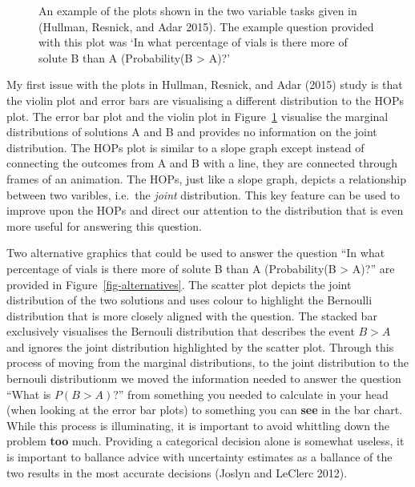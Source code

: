 \documentclass[
  letterpaper,
  DIV=11,
  numbers=noendperiod]{scrartcl}
\begin{document}
\begin{figure}
\begin{minipage}[t]{0.50\linewidth}
{{}

}

\end{minipage}%

\caption{\label{fig-examples}An example of the plots shown in the two
variable tasks given in (Hullman, Resnick, and Adar 2015). The example
question provided with this plot was `In what percentage of vials is
there more of solute B than A (Probability(B \textgreater{} A)?'}

\end{figure}

My first issue with the plots in Hullman, Resnick, and Adar (2015) study
is that the violin plot and error bars are visualising a different
distribution to the HOPs plot. The error bar plot and the violin plot in
Figure~\ref{fig-examples} visualise the marginal distributions of
solutions A and B and provides no information on the joint distribution.
The HOPs plot is similar to a slope graph except instead of connecting
the outcomes from A and B with a line, they are connected through frames
of an animation. The HOPs, just like a slope graph, depicts a
relationship between two varibles, i.e.~the \emph{joint} distribution.
This key feature can be used to improve upon the HOPs and direct our
attention to the distribution that is even more useful for answering
this question.

Two alternative graphics that could be used to answer the question ``In
what percentage of vials is there more of solute B than A (Probability(B
\textgreater{} A)?'' are provided in Figure~\ref{fig-alternatives}. The
scatter plot depicts the joint distribution of the two solutions and
uses colour to highlight the Bernoulli distribution that is more closely
aligned with the question. The stacked bar exclusively visualises the
Bernouli distribution that describes the event \(B>A\) and ignores the
joint distribution highlighted by the scatter plot. Through this process
of moving from the marginal distributions, to the joint distribution to
the bernouli distributionm we moved the information needed to answer the
question ``What is \(P(B>A)\)?'' from something you needed to calculate
in your head (when looking at the error bar plots) to something you can
\textbf{see} in the bar chart. While this process is illuminating, it is
important to avoid whittling down the problem \textbf{too} much.
Providing a categorical decision alone is somewhat useless, it is
important to ballance advice with uncertainty estimates as a ballance of
the two results in the most accurate decisions (Joslyn and LeClerc
2012).
\end{document}

